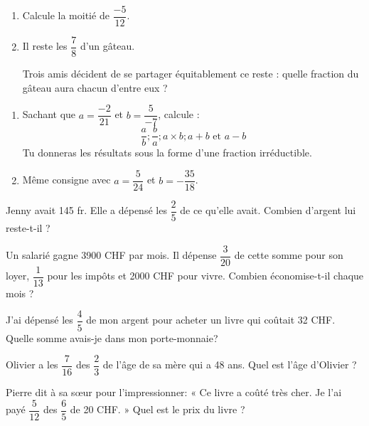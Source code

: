 \begin{exercice}[Partage]
\begin{enumerate}
\item Calcule la moitié de $\dfrac{-5}{12}$.
\item Il reste les $\dfrac{7}{8}$ d'un gâteau.

Trois amis décident de se partager équitablement ce reste : quelle fraction du gâteau aura chacun d'entre eux ?
\end{enumerate}
\end{exercice}


\begin{exercice}
\begin{enumerate}
\item Sachant que $a = \dfrac{-2}{21}$  et $b =\dfrac{5}{-7}$, calcule :
\[	\dfrac{a}{b} ; \dfrac{b}{a} ; a \times b ; a + b \text{ et } a - b\]
Tu donneras les résultats sous la forme d'une fraction irréductible.
\item Même consigne avec $a =\dfrac{5}{24}$  et $b =-\dfrac{35}{18}$.
\end{enumerate}
\end{exercice}


\begin{exercice}
Jenny avait 145 fr. Elle a dépensé les $\dfrac{2}{5}$ de ce qu'elle avait. Combien d’argent lui reste-t-il ?
\end{exercice}


\begin{exercice}
Un salarié gagne 3900 CHF par mois. Il dépense $\dfrac{3}{20}$ de cette somme pour son loyer, $\dfrac{1}{13}$ pour les impôts et 2000 CHF pour vivre. Combien économise-t-il chaque mois ?
\end{exercice}

\columnbreak
\begin{exercice}
J'ai dépensé les $\dfrac{4}{5}$ de mon argent pour acheter un livre qui coûtait 32 CHF. Quelle somme avais-je dans mon porte-monnaie?
\end{exercice}


\begin{exercice}
Olivier a les $\dfrac{7}{16}$ des $\dfrac{2}{3}$ de l'âge de sa mère qui a 48 ans. Quel est l’âge d’Olivier ?
\end{exercice}


\begin{exercice}
Pierre dit à sa sœur pour l'impressionner: « Ce livre a coûté très cher. Je l'ai payé $\dfrac{5}{12}$ des $\dfrac{6}{5}$ de 20 CHF. » Quel est le prix du livre ?
\end{exercice}


